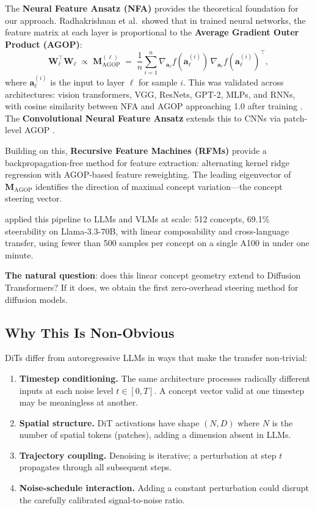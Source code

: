 \documentclass[11pt]{article}
\newcommand{\ba}{\mathbf{a}}
\newcommand{\bM}{\mathbf{M}}
\newcommand{\bW}{\mathbf{W}}
\begin{document}
The \textbf{Neural Feature Ansatz (NFA)} \citep{radhakrishnan2024mechanism} provides the theoretical foundation for our approach.
Radhakrishnan et al.\ showed that in trained neural networks, the feature matrix at each layer is proportional to the \textbf{Average Gradient Outer Product (AGOP)}:
\begin{equation}
    \bW_\ell^\top \bW_\ell \;\propto\; \bM_{\mathrm{AGOP}}^{(\ell)} \;=\; \frac{1}{n}\sum_{i=1}^{n} \nabla_{\ba_\ell} f(\ba_\ell^{(i)})\, \nabla_{\ba_\ell} f(\ba_\ell^{(i)})^\top,
    \label{eq:nfa}
\end{equation}
where $\ba_\ell^{(i)}$ is the input to layer $\ell$ for sample $i$.
This was validated across architectures: vision transformers, VGG, ResNets, GPT-2, MLPs, and RNNs, with cosine similarity between NFA and AGOP approaching 1.0 after training \citep{radhakrishnan2024mechanism}.
The \textbf{Convolutional Neural Feature Ansatz} extends this to CNNs via patch-level AGOP \citep{beaglehole2023cnn}.

Building on this, \textbf{Recursive Feature Machines (RFMs)} \citep{radhakrishnan2024mechanism} provide a backpropagation-free method for feature extraction: alternating kernel ridge regression with AGOP-based feature reweighting.
The leading eigenvector of $\bM_{\mathrm{AGOP}}$ identifies the direction of maximal concept variation---the concept steering vector.

\citet{beaglehole2026universal} applied this pipeline to LLMs and VLMs at scale: 512 concepts, 69.1\% steerability on Llama-3.3-70B, with linear composability and cross-language transfer, using fewer than 500 samples per concept on a single A100 in under one minute.

\textbf{The natural question}: does this linear concept geometry extend to Diffusion Transformers?
If it does, we obtain the first zero-overhead steering method for diffusion models.

\subsection{Why This Is Non-Obvious}

DiTs differ from autoregressive LLMs in ways that make the transfer non-trivial:
\begin{enumerate}[leftmargin=*]
    \item \textbf{Timestep conditioning.} The same architecture processes radically different inputs at each noise level $t \in [0, T]$.
    A concept vector valid at one timestep may be meaningless at another.
    \item \textbf{Spatial structure.} DiT activations have shape $(N, D)$ where $N$ is the number of spatial tokens (patches), adding a dimension absent in LLMs.
    \item \textbf{Trajectory coupling.} Denoising is iterative; a perturbation at step $t$ propagates through all subsequent steps.
    \item \textbf{Noise-schedule interaction.} Adding a constant perturbation could disrupt the carefully calibrated signal-to-noise ratio.
\end{enumerate}
\end{document}
